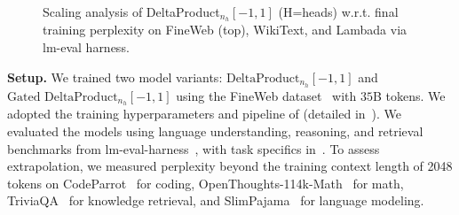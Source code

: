 \documentclass{article} %
\begin{document}
\begin{wrapfigure}[23]{r}{0.3\linewidth}
\centering
\vspace{-12.6pt}
 \\
\vspace{-21pt}
\caption{Scaling analysis of DeltaProduct$_{n_h}[-1, 1]$ (H=heads) w.r.t. final training perplexity on FineWeb (top), WikiText, and Lambada via lm-eval harness.}
\label{fig:scaling-plot}
\end{wrapfigure}
\textbf{Setup.} We trained two model variants: $\text{DeltaProduct}_{n_h}[-1, 1]$ and $\text{Gated DeltaProduct}_{n_h}[-1, 1]$ using the FineWeb dataset~\citep{penedo2024finewebdatasetsdecantingweb} with $35$B tokens. 
We adopted the training hyperparameters and pipeline of \citet{grazzi-iclr25a} (detailed in~). We evaluated the models using language understanding, reasoning, and retrieval benchmarks from lm-eval-harness~\citep{eval-harness}, with task specifics in~. To assess extrapolation, we measured perplexity beyond the training context length of 2048 tokens on CodeParrot~\citep{tunstall2022natural} for coding, OpenThoughts-114k-Math~\citep{openthoughts} for math, TriviaQA~\citep{2017arXivtriviaqa} for knowledge retrieval, and SlimPajama~\citep{cerebras2023slimpajama} for language modeling.
\end{document}
